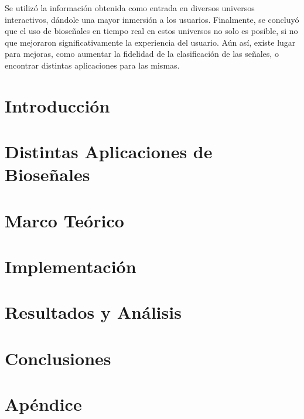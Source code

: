 \documentclass[a4paper]{report}
\begin{document}
Se utilizó la información obtenida como entrada en diversos universos interactivos, dándole una mayor inmersión a los usuarios. Finalmente, se concluyó que el uso de bioseñales en tiempo real en estos universos no solo es posible, si no que mejoraron significativamente la experiencia del usuario. Aún así, existe lugar para mejoras, como aumentar la fidelidad de la clasificación de las señales, o encontrar distintas aplicaciones para las mismas.

\tableofcontents

\chapter{Introducción}


\chapter{Distintas Aplicaciones de Bioseñales} \label{chap:biosignal-apps}


\chapter{Marco Teórico}


\chapter{Implementación}


\chapter{Resultados y Análisis}



\chapter{Conclusiones}


\appendix
\chapter{Apéndice}

\printglossary[type=\acronymtype,title={Lista de Acrónimos}]

{}

\end{document}
